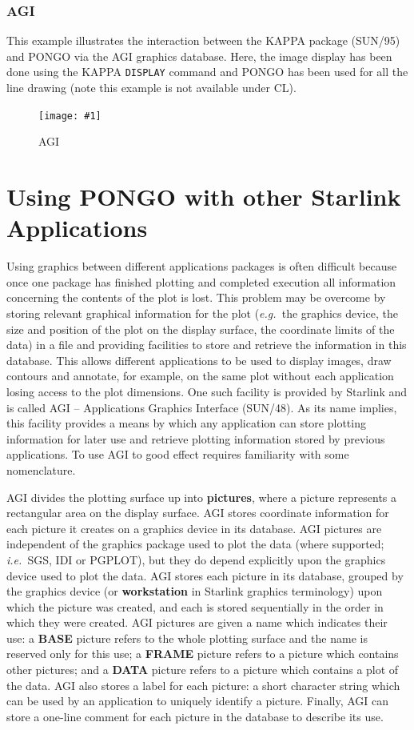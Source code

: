 \documentclass[twoside,11pt]{article}
\newcommand{\htmladdimg}[1]{}
\newcommand{\xref}[3]{#1}
\renewcommand{\_}{\texttt{\symbol{95}}}
\newcommand{\eg}{{\em e.g.\ }}
\newcommand{\ie}{{\em i.e.\ }}
\newcommand{\halfpfig} [4] {
  \begin{figure}[htbp]
    \setlength{\unitlength}{1in}
    \centering\texttt{[image: \#1]}
    \typeout{#1 inserted on page \arabic{page}}
    \caption{#2}
    \label{#2}
  \end{figure}
}
\newcommand{\halfpfig}[4]{
      \htmladdimg{#3}\\
      Figure: \label{#2} #2
   }
\newcommand{\cnam}[1]{{\tt #1}}
\begin{document}
\newpage
\subsubsection{AGI}

This example illustrates the interaction between the \xref{KAPPA
package (SUN/95)}{sun95}{} and PONGO via the \xref{AGI graphics
database}{sun48}{}.  Here, the image display has been done using the
\xref{KAPPA \cnam{DISPLAY}}{sun95}{DISPLAY} command and PONGO has been
used for all the line drawing (note this example is not available
under CL).

\halfpfig{sun137_fig8}{AGI}{agi.gif}{7in}
\newpage


\section{Using PONGO with other Starlink Applications}

Using graphics between different applications packages is often difficult
because once one package has finished plotting and completed execution all
information concerning the contents of the plot is lost.
This problem may be overcome by storing relevant graphical information for the
plot (\eg the graphics device, the size and position of the plot on the display
surface, the coordinate limits of the data) in a file and providing facilities
to store and retrieve the information in this database.
This allows different applications to be used to display images, draw contours
and  annotate, for example, on the same plot without each application losing
access to the plot dimensions.
One such facility is provided by Starlink and is called
\xref{AGI -- Applications Graphics Interface (SUN/48)}{sun48}{}.
As its name implies, this facility provides a means by which any application
can store plotting information for later use and retrieve plotting information
stored by previous applications.
To use AGI to good effect requires familiarity with some nomenclature.

AGI divides the plotting surface up into {\bf pictures}, where a picture
represents a rectangular area on the display surface.
AGI stores coordinate information for each picture it creates on a graphics
device in its database.
AGI pictures are independent of the graphics package used to plot the data
(where supported; \ie SGS, IDI or PGPLOT), but they do depend explicitly upon
the graphics device used to plot the data.
AGI stores each picture in its database, grouped by the graphics device (or
{\bf workstation} in Starlink graphics terminology) upon which the picture was
created, and each is stored sequentially in the order in which they were
created.
AGI pictures are given a name which indicates their use:
a {\bf BASE} picture refers to the whole plotting surface and the name is
reserved only for this use;
a {\bf FRAME} picture refers to a picture which contains other pictures;
and a {\bf DATA} picture refers to a picture which contains a plot of the data.
AGI also stores a label for each picture: a short character string which
can be used by an application to uniquely identify a picture.
Finally, AGI can store a one-line comment for each picture in the database to
describe its use.
\end{document}
